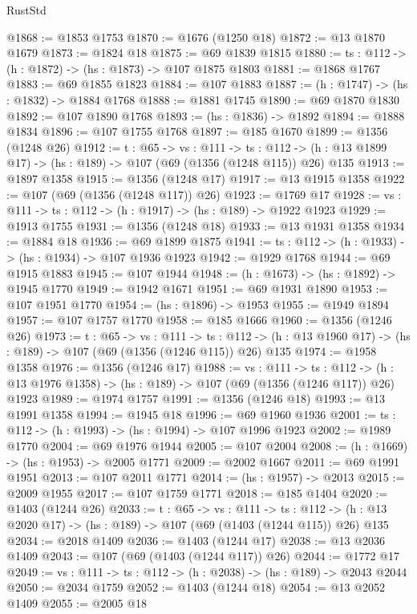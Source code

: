 \begin{lexlean}{RustStd}
\begin{coremodule}
{\begin{coremodule}
{{{@1868 := @1853 @1753
@1870 := @1676 (@1250 @18)
@1872 := @13 @1870 @1679
@1873 := @1824 @18
@1875 := @69 @1839 @1815
@1880 := {ts : @112} -> (h : @1872) -> (hs : @1873) -> @107 @1875 @1803
@1881 := @1868 @1767
@1883 := @69 @1855 @1823
@1884 := @107 @1883
@1887 := (h : @1747) -> (hs : @1832) -> @1884 @1768
@1888 := @1881 @1745
@1890 := @69 @1870 @1830
@1892 := @107 @1890 @1768
@1893 := (hs : @1836) -> @1892
@1894 := @1888 @1834
@1896 := @107 @1755 @1768
@1897 := @185 @1670
@1899 := @1356 (@1248 @26)
@1912 := {t : @65} ->
  {vs : @111} ->
  {ts : @112} -> (h : @13 @1899 @17) -> (hs : @189) -> @107 (@69 (@1356 (@1248 @115)) @26) @135
@1913 := @1897 @1358
@1915 := @1356 (@1248 @17)
@1917 := @13 @1915 @1358
@1922 := @107 (@69 (@1356 (@1248 @117)) @26)
@1923 := @1769 @17
@1928 := {vs : @111} -> {ts : @112} -> (h : @1917) -> (hs : @189) -> @1922 @1923
@1929 := @1913 @1755
@1931 := @1356 (@1248 @18)
@1933 := @13 @1931 @1358
@1934 := @1884 @18
@1936 := @69 @1899 @1875
@1941 := {ts : @112} -> (h : @1933) -> (hs : @1934) -> @107 @1936 @1923
@1942 := @1929 @1768
@1944 := @69 @1915 @1883
@1945 := @107 @1944
@1948 := (h : @1673) -> (hs : @1892) -> @1945 @1770
@1949 := @1942 @1671
@1951 := @69 @1931 @1890
@1953 := @107 @1951 @1770
@1954 := (hs : @1896) -> @1953
@1955 := @1949 @1894
@1957 := @107 @1757 @1770
@1958 := @185 @1666
@1960 := @1356 (@1246 @26)
@1973 := {t : @65} ->
  {vs : @111} ->
  {ts : @112} -> (h : @13 @1960 @17) -> (hs : @189) -> @107 (@69 (@1356 (@1246 @115)) @26) @135
@1974 := @1958 @1358
@1976 := @1356 (@1246 @17)
@1988 := {vs : @111} ->
  {ts : @112} -> (h : @13 @1976 @1358) -> (hs : @189) -> @107 (@69 (@1356 (@1246 @117)) @26) @1923
@1989 := @1974 @1757
@1991 := @1356 (@1246 @18)
@1993 := @13 @1991 @1358
@1994 := @1945 @18
@1996 := @69 @1960 @1936
@2001 := {ts : @112} -> (h : @1993) -> (hs : @1994) -> @107 @1996 @1923
@2002 := @1989 @1770
@2004 := @69 @1976 @1944
@2005 := @107 @2004
@2008 := (h : @1669) -> (hs : @1953) -> @2005 @1771
@2009 := @2002 @1667
@2011 := @69 @1991 @1951
@2013 := @107 @2011 @1771
@2014 := (hs : @1957) -> @2013
@2015 := @2009 @1955
@2017 := @107 @1759 @1771
@2018 := @185 @1404
@2020 := @1403 (@1244 @26)
@2033 := {t : @65} ->
  {vs : @111} ->
  {ts : @112} -> (h : @13 @2020 @17) -> (hs : @189) -> @107 (@69 (@1403 (@1244 @115)) @26) @135
@2034 := @2018 @1409
@2036 := @1403 (@1244 @17)
@2038 := @13 @2036 @1409
@2043 := @107 (@69 (@1403 (@1244 @117)) @26)
@2044 := @1772 @17
@2049 := {vs : @111} -> {ts : @112} -> (h : @2038) -> (hs : @189) -> @2043 @2044
@2050 := @2034 @1759
@2052 := @1403 (@1244 @18)
@2054 := @13 @2052 @1409
@2055 := @2005 @18
}}}
\end{coremodule}}
\end{coremodule}
\end{lexlean}
